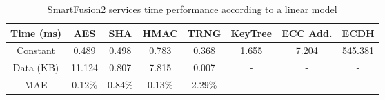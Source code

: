 \begin{table}[h!]
\centering
\def\arraystretch{1.5}
\begin{tabular}{|c|c|c|c|c|c|c|c|}
\hline
Time (ms) & AES    & SHA    & HMAC   & TRNG   & KeyTree & ECC Add. & ECDH	\\ \hline
Constant  & 0.489  & 0.498  & 0.783  & 0.368  & 1.655   & 7.204    & 545.381	\\ \hline
Data (KB) & 11.124 & 0.807  & 7.815  & 0.007  & -       & -	   & -		\\ \hline
MAE       & 0.12\% & 0.84\% & 0.13\% & 2.29\% & -       & -	   & -		\\ \hline
\end{tabular}
\caption{SmartFusion2 services time performance according to a linear model}
\label{tab:core-model}
\end{table}
